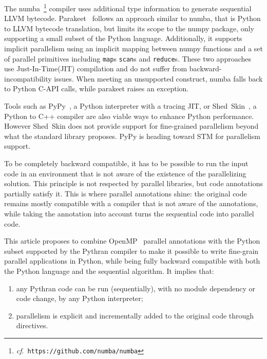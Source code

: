 \documentclass[conference]{IEEEtran}
\begin{document}
The numba~\footnote{\emph{cf}.\ \texttt{https://github.com/numba/numba}}
compiler uses additional type information to generate sequential LLVM bytecode.
Parakeet~\cite{parakeet2012} follows an approach similar to numba, that is
Python to LLVM bytecode translation, but limits its scope to the numpy package,
only supporting a small subset of the Python language. Additionally, it supports
implicit parallelism using an implicit mapping between numpy functions and a set
of parallel primitives including \texttt{map}s \texttt{scan}s and
\texttt{reduce}s. These two approaches use Just-In-Time(JIT) compilation and do
not suffer from backward-incompatibility issues. When meeting an unsupported
construct, numba falls back to Python C-API calls, while parakeet raises an
exception.

Tools such as PyPy~\cite{pypy2009}, a Python interpreter with a tracing JIT, or
Shed~Skin~\cite{shedskin2006}, a Python to C++ compiler are also viable ways to
enhance Python performance. However Shed~Skin does not provide support for
fine-grained parallelism beyond what the standard library proposes. PyPy is
heading toward STM for parallelism support.

To be completely backward compatible, it has to be possible to run the input
code in an environment that is not aware of the existence of the parallelizing
solution. This principle is not respected by parallel libraries, but code
annotations partially satisfy it. This is where parallel annotations shine: the
original code remains mostly compatible with a compiler that is not aware of the
annotations, while taking the annotation into account turns the sequential code
into parallel code.

This article proposes to combine OpenMP~\cite{openmp3.1} parallel annotations
with the Python subset supported by the Pythran compiler to make it possible to
write fine-grain parallel applications in Python, while being fully backward
compatible with both the Python language and the sequential algorithm. It
implies that:

\begin{enumerate}

    \item any Pythran code can be run (sequentially), with no module dependency
        or code change, by any Python interpreter;

    \item parallelism is explicit and incrementally added to the original code
        through directives.

\end{enumerate}
\end{document}
